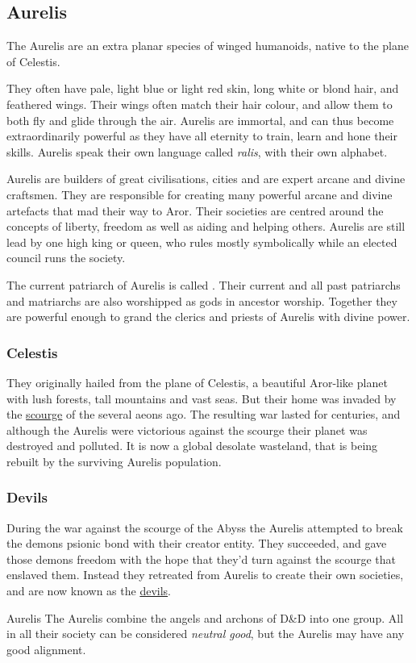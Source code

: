 \subsection{Aurelis}
\label{sec:Aurelis}

The Aurelis are an extra planar species of winged humanoids, native to the plane
of Celestis.

They often have pale, light blue or light red skin, long white or blond hair,
and feathered wings. Their wings often match their hair colour, and allow them
to both fly and glide through the air. Aurelis are immortal, and can thus become
extraordinarily powerful as they have all eternity to train, learn and hone
their skills. Aurelis speak their own language called \emph{ralis}, with
their own alphabet.

Aurelis are builders of great civilisations, cities and are expert arcane and
divine craftsmen. They are responsible for creating many powerful arcane and
divine artefacts that mad their way to Aror. Their societies are centred
around the concepts of liberty, freedom as well as aiding and helping
others. Aurelis are still lead by one high king or queen, who rules mostly
symbolically while an elected council runs the society.

The current patriarch of Aurelis is called . Their current
and all past patriarchs and matriarchs are also worshipped as gods in ancestor
worship. Together they are powerful enough to grand the clerics and priests
of Aurelis with divine power.

\subsubsection{Celestis}
\label{sec:Celestis}

They originally hailed from the plane of Celestis, a beautiful Aror-like planet
with lush forests, tall mountains and vast seas. But their home
was invaded by the \hyperref[sec:Scourge]{scourge} of the 
several aeons ago. The resulting war lasted for centuries, and although the
Aurelis were victorious against the scourge their planet was destroyed and
polluted. It is now a global desolate wasteland, that is being rebuilt by the
surviving Aurelis population.

\subsubsection{Devils}

During the war against the scourge of the Abyss the Aurelis attempted to break
the demons psionic bond with their creator entity. They succeeded, and gave
those demons freedom with the hope that they'd turn against the scourge that
enslaved them. Instead they retreated from Aurelis to create their own
societies, and are now known as the \hyperref[sec:Devils]{devils}.

\begin{35e}{Aurelis}
  The Aurelis combine the angels and archons of D\&D into one group. All in all
  their society can be considered \emph{neutral good}, but the Aurelis may have
  any good alignment.
\end{35e}
